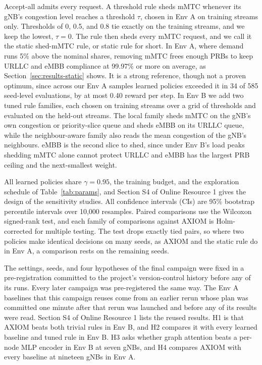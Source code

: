 \documentclass[pdflatex,sn-basic,Numbered]{sn-jnl}
\begin{document}
Accept-all admits every request. A threshold rule sheds mMTC whenever its gNB's congestion level reaches a threshold $\tau$, chosen in Env A on training streams only. Thresholds of 0, 0.5, and 0.8 tie exactly on the training streams, and we keep the lowest, $\tau{=}0$. The rule then sheds every mMTC request, and we call it the static shed-mMTC rule, or static rule for short. In Env A, where demand runs 5\% above the nominal shares, removing mMTC frees enough PRBs to keep URLLC and eMBB compliance at 99.97\% or more on average, as Section~\ref{sec:results-static} shows. It is a strong reference, though not a proven optimum, since across our Env A samples learned policies exceeded it in 34 of 585 seed-level evaluations, by at most 0.40 reward per step. In Env B we add two tuned rule families, each chosen on training streams over a grid of thresholds and evaluated on the held-out streams. The local family sheds mMTC on the gNB's own congestion or priority-slice queue and sheds eMBB on its URLLC queue, while the neighbour-aware family also reads the mean congestion of the gNB's neighbours. eMBB is the second slice to shed, since under Env B's load peaks shedding mMTC alone cannot protect URLLC and eMBB has the largest PRB ceiling and the next-smallest weight.

All learned policies share $\gamma=0.95$, the training budget, and the exploration schedule of Table~\ref{tab:params}, and Section S4 of Online Resource 1 gives the design of the sensitivity studies. All confidence intervals (CIs) are 95\% bootstrap percentile intervals over 10{,}000 resamples. Paired comparisons use the Wilcoxon signed-rank test, and each family of comparisons against AXIOM is Holm-corrected for multiple testing. The test drops exactly tied pairs, so where two policies make identical decisions on many seeds, as AXIOM and the static rule do in Env A, a comparison rests on the remaining seeds.

The settings, seeds, and four hypotheses of the final campaign were fixed in a pre-registration committed to the project's version-control history before any of its runs. Every later campaign was pre-registered the same way. The Env A baselines that this campaign reuses come from an earlier rerun whose plan was committed one minute after that rerun was launched and before any of its results were read. Section S4 of Online Resource 1 lists the reused results. H1 is that AXIOM beats both trivial rules in Env B, and H2 compares it with every learned baseline and tuned rule in Env B. H3 asks whether graph attention beats a per-node MLP encoder in Env B at seven gNBs, and H4 compares AXIOM with every baseline at nineteen gNBs in Env A.
\end{document}
